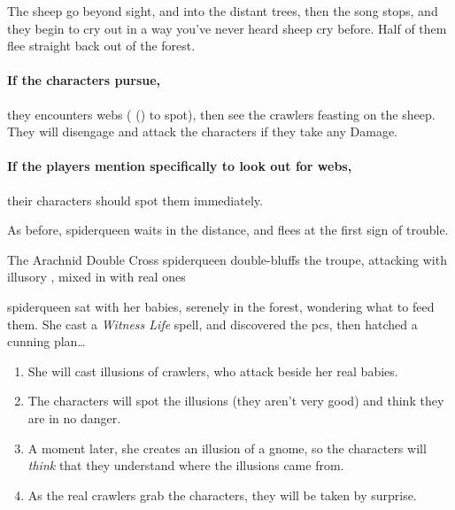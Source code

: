 \begin{boxtext}
  The sheep go beyond sight, and into the distant trees, then the song stops, and they begin to cry out in a way you've never heard sheep cry before.  Half of them flee straight back out of the forest.
\end{boxtext}

\paragraph{If the characters pursue,}
they encounters webs ( (\tn[9]) to spot), then see the \glspl{crawler} feasting on the sheep.
They will disengage and attack the characters if they take any Damage.

\paragraph{If the players mention specifically to look out for webs,}
their characters should spot them immediately.


As before, \gls{spiderqueen} waits in the distance, and flees at the first sign of trouble.


{The Arachnid Double Cross}%
{\Gls{spiderqueen} double-bluffs the troupe, attacking with illusory , mixed in with real ones}%
\label{spiderqueenssong}

\Gls{spiderqueen} sat with her babies, serenely in the forest, wondering what to feed them.
She cast a \textit{Witness Life} spell, and discovered the \glspl{pc}, then hatched a cunning plan\ldots

\begin{enumerate}
  \item
    She will cast illusions of \glspl{crawler}, who attack beside her real babies.
  \item
  The characters will spot the illusions (they aren't very good) and think they are in no danger.
  \item
  A moment later, she creates an illusion of a gnome, so the characters will \emph{think} that they understand where the illusions came from.
  \item
  As the real \glspl{crawler} grab the characters, they will be taken by surprise.
\end{enumerate}


